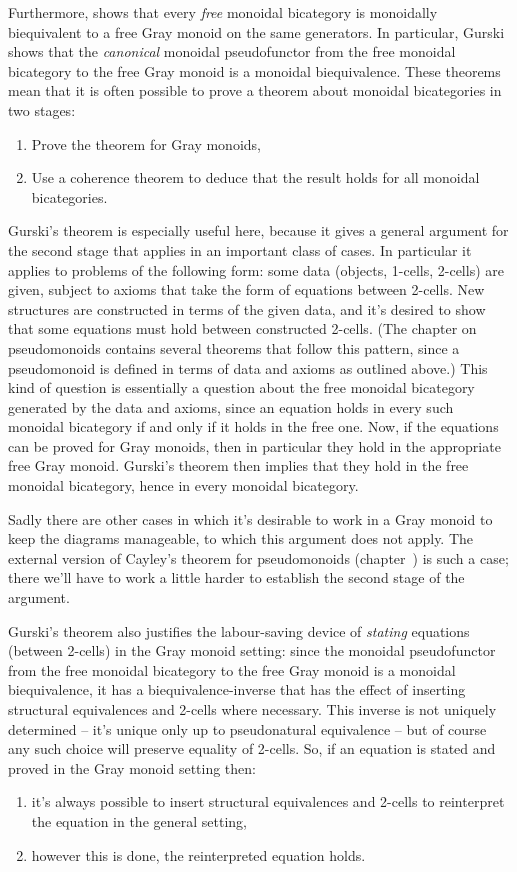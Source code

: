 Furthermore, \citet{GurskiThesis} shows that every \emph{free} monoidal bicategory
is monoidally biequivalent to a free Gray monoid on the same generators.
In particular, Gurski shows that the \emph{canonical} monoidal pseudofunctor
from the free monoidal bicategory to the free Gray monoid is a monoidal
biequivalence.
%
These theorems mean that it is often possible to prove a theorem
about monoidal bicategories in two stages:
\begin{enumerate}
	\item Prove the theorem for Gray monoids,
	\item Use a coherence theorem to deduce that the result
		holds for all monoidal bicategories.
\end{enumerate}
%
Gurski's theorem is especially
useful here, because it gives a general argument for the second stage
that applies in an important class of cases. In particular it applies
to problems of the following form: some data (objects, 1-cells,
2-cells) are given, subject to axioms that take the form of
equations between 2-cells. New structures are constructed in terms
of the given data, and it's desired to show that some equations
must hold between constructed 2-cells. (The chapter on pseudomonoids
contains several theorems that follow this pattern, since a pseudomonoid
is defined in terms of data and axioms as outlined above.) This kind of
question is 
essentially a question about the free monoidal bicategory generated
by the data and axioms, since an equation holds in every such monoidal
bicategory if and only if it holds in the free one. Now, if the equations
can be proved for Gray monoids, then in particular they hold in the
appropriate free Gray monoid. Gurski's theorem then implies that they
hold in the free monoidal bicategory, hence in every monoidal bicategory.

Sadly there are other cases in which it's desirable to work in a Gray
monoid to keep the diagrams manageable, to which this argument does
not apply. The external version of Cayley's theorem for pseudomonoids
(chapter~\chCayley) is such a case; there we'll have to work a little harder
to establish the second stage of the argument.

Gurski's theorem also justifies the labour-saving device of \emph{stating}
equations (between 2-cells) in the Gray monoid setting: since the monoidal
pseudofunctor from the free monoidal bicategory to the free Gray monoid is
a monoidal biequivalence, it has a biequi\-valence-inverse that has the effect
of inserting structural equivalences and 2-cells where necessary. This
inverse is not uniquely determined -- it's unique only up to pseudonatural
equivalence -- but of course any such choice will preserve equality
of 2-cells. So, if an equation is stated and proved in the Gray monoid
setting then:
\begin{enumerate}
	\item it's always possible to insert structural equivalences and
		2-cells to reinterpret the equation in the general setting,
	\item however this is done, the reinterpreted equation holds.
\end{enumerate}

